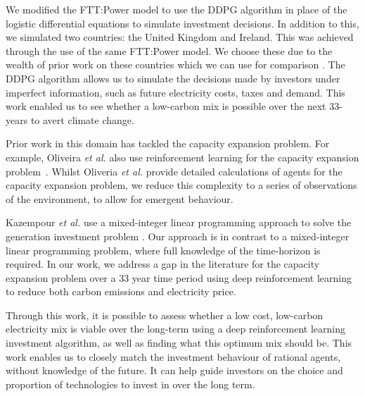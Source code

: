 \documentclass{article}
\begin{document}
We modified the FTT:Power model to use the DDPG algorithm in place of the logistic differential equations to simulate investment decisions. In addition to this, we simulated two countries: the United Kingdom and Ireland. This was achieved through the use of the same FTT:Power model. We choose these due to the wealth of prior work on these countries which we can use for comparison \cite{Hall2016, Hughes2010}. The DDPG algorithm allows us to simulate the decisions made by investors under imperfect information, such as future electricity costs, taxes and demand. This work enabled us to see whether a low-carbon mix is possible over the next 33-years to avert climate change. 


Prior work in this domain has tackled the capacity expansion problem. For example, Oliveira \textit{et al.} also use reinforcement learning for the capacity expansion problem~\cite{Oliveira2018}. Whilst Oliveria \textit{et al.} provide detailed calculations of agents for the capacity expansion problem, we reduce this complexity to a series of observations of the environment, to allow for emergent behaviour. 

Kazempour \textit{et al.} use a mixed-integer linear programming approach to solve the generation investment problem \cite{Kazempour2011}. Our approach is in contrast to a mixed-integer linear programming problem, where full knowledge of the time-horizon is required. In our work, we address a gap in the literature for the capacity expansion problem over a 33 year time period using deep reinforcement learning to reduce both carbon emissions and electricity price. 

Through this work, it is possible to assess whether a low cost, low-carbon electricity mix is viable over the long-term using a deep reinforcement learning investment algorithm, as well as finding what this optimum mix should be. This work enables us to closely match the investment behaviour of rational agents, without knowledge of the future. It can help guide investors on the choice and proportion of technologies to invest in over the long term.
\end{document}
